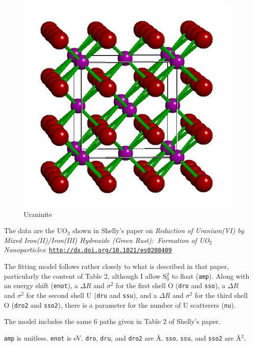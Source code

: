 \documentclass{article}
\begin{document}
\begin{figure}
  \includegraphics[width=\linewidth]{UO2/UO2.png}
  \caption{Uraninite}
\end{figure}
The data are the UO$_2$ shown in Shelly's paper on \textit{Reduction
  of Uranium(VI) by Mixed Iron(II)/Iron(III) Hydroxide (Green Rust): 
  Formation of UO$_2$ Nanoparticles}:
\href{http://dx.doi.org/10.1021/es0208409}{\texttt{http://dx.doi.org/10.1021/es0208409}}

The fitting model follows rather closely to what is described in that
paper, particularly the content of Table 2, although I allow S$_0^2$
to float (\texttt{amp}).  Along with an energy shift (\texttt{enot}),
a $\Delta R$ and $\sigma^2$ for the first shell O (\texttt{dro} and
\texttt{sso}), a $\Delta R$ and $\sigma^2$ for the second shell U
(\texttt{dru} and \texttt{ssu}), and a $\Delta R$ and $\sigma^2$ for
the third shell O (\texttt{dro2} and \texttt{sso2}), there is a
parameter for the number of U scatterers (\texttt{nu}).

The model includes the same 6 paths given in Table 2 of Shelly's
paper.

\texttt{amp} is unitless.  \texttt{enot} is eV.
\texttt{dro}, \texttt{dru}, and \texttt{dro2} are \AA.
\texttt{sso}, \texttt{ssu}, and \texttt{sso2} are \AA$^2$.


\def\feffmaterial{UO2}
\def\feffrone{3}
\def\feffrtwo{4}
\def\feffrthree{5}
\def\feffrfour{5.5}
\def\feffrfive{6}
\def\fefffirst{}
\end{document}
